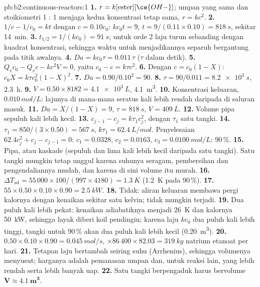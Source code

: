 \begin{solution}{pb:b2:continuous-reactors:1}
\textbf{1.} $r = k[\text{ester}][\ce{OH-}]$; umpan yang sama dan
stoikiometri 1 : 1 menjaga kedua konsentrasi tetap sama, $r = kc^2$.
\textbf{2.} $1/c - 1/c_0 = kt$ dengan $c = 0.10c_0$: $kc_0t = 9$, $t = 9/(0.11
\times 0.10) = \qty{818}{s}$, sekitar \qty{14}{min}.
\textbf{3.} $t_{1/2} = 1/(kc_0) = \qty{91}{s}$; untuk orde 2 laju turun
sebanding dengan kuadrat konsentrasi, sehingga waktu untuk menjadikannya
separuh bergantung pada titik awalnya.
\textbf{4.} $Da = kc_0\tau = 0.011\,\tau$ ($\tau$ dalam detik).
\textbf{5.} $Q_vc_0 - Q_vc - kc^2V = 0$, yaitu $c_0 - c = k\tau c^2$.
\textbf{6.} Dengan $c = c_0(1 - X)$: $c_0X = k\tau c_0^2(1 - X)^2$.
\textbf{7.} $Da = 0.90/0.10^2 = 90$.
\textbf{8.} $\tau = 90/0.011 = \qty{8.2e3}{s}$, \qty{2.3}{h}.
\textbf{9.} $V = 0.50 \times 8182 = \qty{4.1e3}{L}$, \qty{4.1}{m^3}.
\textbf{10.} Konsentrasi keluaran, $0.010\,\unit{mol/L}$: lajunya di
mana-mana seratus kali lebih rendah daripada di saluran masuk.
\textbf{11.} $Da = X/(1 - X) = 9$, $\tau = \qty{818}{s}$, $V = \qty{409}{L}$.
\textbf{12.} Volume pipa sepuluh kali lebih kecil.
\textbf{13.} $c_{j-1} - c_j = k\tau_1c_j^2$, dengan $\tau_1$ 
satu tangki.
\textbf{14.} $\tau_1 = 850/(3 \times 0.50) = \qty{567}{s}$, $k\tau_1 =
\qty{62.4}{L/mol}$. Penyelesaian $62.4c_j^2 + c_j - c_{j-1} = 0$:
$c_1 = 0.0328$, $c_2 = 0.0163$, $c_3 = \qty{0.0100}{mol/L}$: 
90\,\%.
\textbf{15.} Pipa, atau kaskade (sepuluh dan lima kali lebih kecil daripada
satu tangki). Satu tangki mungkin tetap unggul karena suhunya seragam,
pembersihan dan pengendaliannya mudah, dan karena di sini volume itu murah.
\textbf{16.} $\Delta T_{\text{ad}} = 55\,000 \times 100/(997 \times 4180) =
\qty{1.3}{K}$ (\qty{1.2}{K} pada 90\,\%).
\textbf{17.} $55 \times 0.50 \times 0.10 \times 0.90 = \qty{2.5}{kW}$.
\textbf{18.} Tidak: aliran keluaran membawa pergi kalornya dengan kenaikan
sekitar satu kelvin;  tidak mungkin terjadi.
\textbf{19.} Dua puluh kali lebih pekat: kenaikan adiabatiknya menjadi
\qty{26}{K} dan kalornya \qty{50}{kW}, sehingga layak diberi koil
pendingin; karena laju $kc_0$ dua puluh kali lebih tinggi, tangki untuk
90\,\% akan dua puluh kali lebih kecil (\qty{0.20}{m^3}).
\textbf{20.} $0.50 \times 0.10 \times 0.90 = \qty{0.045}{mol/s}$, $\times 86\,400
\times 82.03 = \qty{319}{kg}$ natrium etanoat per hari.
\textbf{21.} Tetapan laju bertambah seiring suhu (Arrhenius), sehingga
volumenya menyusut; harganya adalah pemanasan umpan dan, untuk reaksi
lain,  yang lebih rendah serta lebih banyak uap.
\textbf{22.} Satu tangki berpengaduk harus bervolume
$\boldsymbol{V \approx
\qty{4.1}{m^3}}$.
\end{solution}
